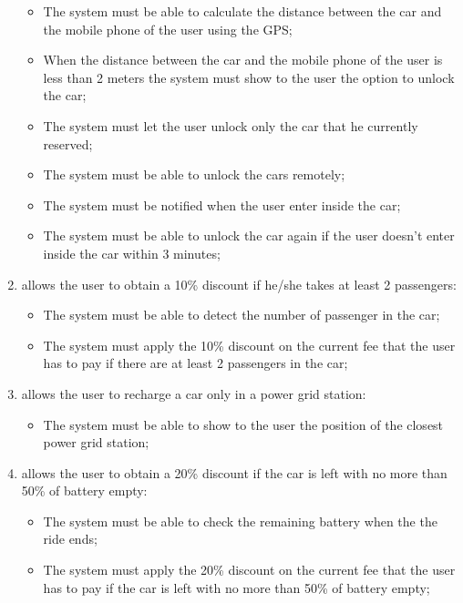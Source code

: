 \begin{enumerate}
\begin{itemize}
\item The system must be able to calculate the distance between the car and the mobile phone of the user using the GPS;
\item When the distance between the car and the mobile phone of the user is less than 2 meters the system must show to the user the option to unlock the car;
\item The system must let the user unlock only the car that he currently reserved;
\item The system must be able to unlock the cars remotely;
\item The system must be notified when the user enter inside the car;
\item The system must be able to unlock the car again if the user doesn't enter inside the car within 3 minutes;
\end{itemize}

\item allows the user to obtain a 10\% discount if he/she takes at least 2 passengers:

\begin{itemize}
\item The system must be able to detect the number of passenger in the car;
\item The system must apply the 10\% discount on the current fee that the user has to pay if there are at least 2 passengers in the car;
\end{itemize}

\item allows the user to recharge a car only in a power grid station:

\begin{itemize}
\item The system must be able to show to the user the position of the closest power grid station;
\end{itemize}

\item allows the user to obtain a 20\% discount if the car is left with no more than 50\% of battery empty:

\begin{itemize}
\item The system must be able to check the remaining battery when the the ride ends;
\item The system must apply the 20\% discount on the current fee that the user has to pay if the car is left with no more than 50\% of battery empty;
\end{itemize}


\end{enumerate}
